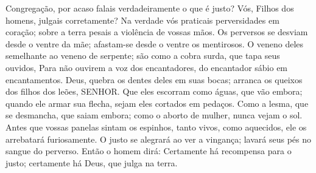 
{\PP 
  Congregação, por acaso falais verdadeiramente o que é justo? Vós, Filhos dos homens, julgais corretamente?
  Na verdade vós praticais perversidades em
{} coração; sobre a terra pesais a violência de vossas mãos.
  Os perversos se desviam desde o ventre da mãe; afastam-se desde o ventre os mentirosos.
  O veneno deles
{} semelhante ao veneno de serpente; são como a cobra surda, que tapa seus ouvidos,
  Para não ouvirem a voz dos encantadores, do encantador sábio em encantamentos.
  Deus, quebra os dentes deles em suas bocas; arranca os queixos dos filhos dos leões, SENHOR.
  Que eles escorram como águas, que vão embora; quando ele armar sua flecha, sejam eles cortados em pedaços.
  Como a lesma, que se desmancha, que
{} saiam embora; como o aborto de mulher,
{} nunca vejam o sol.
  Antes que vossas panelas sintam os espinhos, tanto vivos, como aquecidos, ele os arrebatará furiosamente.
  O justo se alegrará ao ver a vingança;
{} lavará seus pés no sangue do perverso.
  Então o homem dirá: Certamente há recompensa para o justo; certamente há Deus, que julga na terra.
\par }


